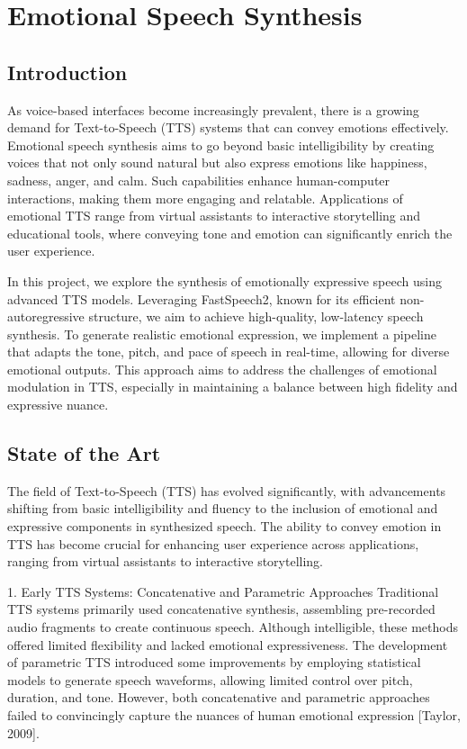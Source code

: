 \section{Emotional Speech Synthesis}

\subsection{Introduction}

As voice-based interfaces become increasingly prevalent, there is a growing demand for Text-to-Speech (TTS) systems that can convey emotions effectively. Emotional speech synthesis aims to go beyond basic intelligibility by creating voices that not only sound natural but also express emotions like happiness, sadness, anger, and calm. Such capabilities enhance human-computer interactions, making them more engaging and relatable. Applications of emotional TTS range from virtual assistants to interactive storytelling and educational tools, where conveying tone and emotion can significantly enrich the user experience.

In this project, we explore the synthesis of emotionally expressive speech using advanced TTS models. Leveraging FastSpeech2, known for its efficient non-autoregressive structure, we aim to achieve high-quality, low-latency speech synthesis. To generate realistic emotional expression, we implement a pipeline that adapts the tone, pitch, and pace of speech in real-time, allowing for diverse emotional outputs. This approach aims to address the challenges of emotional modulation in TTS, especially in maintaining a balance between high fidelity and expressive nuance.

\subsection{State of the Art}

The field of Text-to-Speech (TTS) has evolved significantly, with advancements shifting from basic intelligibility and fluency to the inclusion of emotional and expressive components in synthesized speech. The ability to convey emotion in TTS has become crucial for enhancing user experience across applications, ranging from virtual assistants to interactive storytelling.

1. Early TTS Systems: Concatenative and Parametric Approaches
Traditional TTS systems primarily used concatenative synthesis, assembling pre-recorded audio fragments to create continuous speech. Although intelligible, these methods offered limited flexibility and lacked emotional expressiveness. The development of parametric TTS introduced some improvements by employing statistical models to generate speech waveforms, allowing limited control over pitch, duration, and tone. However, both concatenative and parametric approaches failed to convincingly capture the nuances of human emotional expression [Taylor, 2009].

